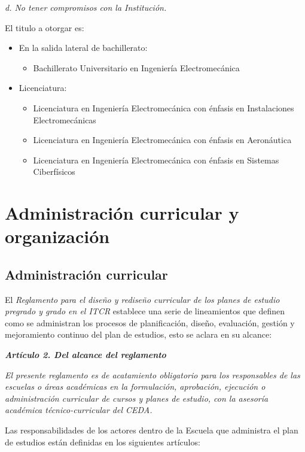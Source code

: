 \textit{d. No tener compromisos con la Institución.}\par

El titulo a otorgar es:\par

\begin{itemize}
\item En la salida lateral de bachillerato:
\begin{itemize}
\item Bachillerato Universitario en Ingeniería Electromecánica
\end{itemize}
\item Licenciatura:
\begin{itemize}
\item Licenciatura en Ingeniería Electromecánica con énfasis en Instalaciones Electromecánicas
\item Licenciatura en Ingeniería Electromecánica con énfasis en Aeronáutica
\item Licenciatura en Ingeniería Electromecánica con énfasis en Sistemas Ciberfísicos
\end{itemize}
\end{itemize}
\section*{Administración curricular y organización}

\subsection*{Administración curricular}

El \textit{Reglamento para el diseño y rediseño curricular de los planes de estudio pregrado y grado en el ITCR} establece una serie de lineamientos que definen como se administran los procesos de planificación, diseño, evaluación, gestión y mejoramiento continuo del plan de estudios, esto se aclara en su alcance:\par

\textit{\textbf{Artículo 2. Del alcance del reglamento }}\par

\textit{El presente reglamento es de acatamiento obligatorio para los responsables de las escuelas o áreas académicas en la formulación, aprobación, ejecución o administración curricular de cursos y planes de estudio, con la asesoría académica técnico-curricular del CEDA.}\par

Las responsabilidades de los actores dentro de la Escuela que administra el plan de estudios están definidas en los siguientes artículos:\par

